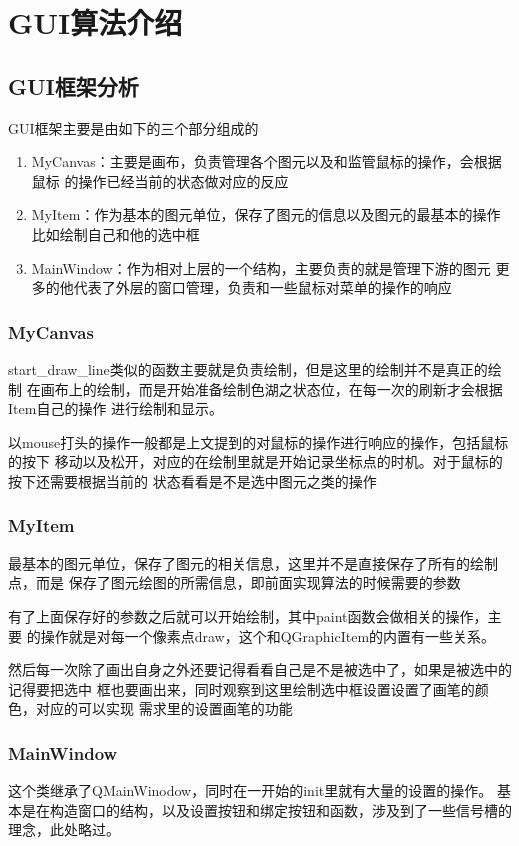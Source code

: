 \documentclass[a4paper,UTF8]{article}
\theoremstyle{definition}
\begin{document}
\section{GUI算法介绍}
\subsection{GUI框架分析}
GUI框架主要是由如下的三个部分组成的

\begin{enumerate}
    \item MyCanvas：主要是画布，负责管理各个图元以及和监管鼠标的操作，会根据鼠标
    的操作已经当前的状态做对应的反应
    
    \item MyItem：作为基本的图元单位，保存了图元的信息以及图元的最基本的操作
    比如绘制自己和他的选中框
    
    \item MainWindow：作为相对上层的一个结构，主要负责的就是管理下游的图元
    更多的他代表了外层的窗口管理，负责和一些鼠标对菜单的操作的响应
\end{enumerate}


\subsubsection{MyCanvas}
start\_draw\_line类似的函数主要就是负责绘制，但是这里的绘制并不是真正的绘制
在画布上的绘制，而是开始准备绘制色湖之状态位，在每一次的刷新才会根据Item自己的操作
进行绘制和显示。

以mouse打头的操作一般都是上文提到的对鼠标的操作进行响应的操作，包括鼠标的按下
移动以及松开，对应的在绘制里就是开始记录坐标点的时机。对于鼠标的按下还需要根据当前的
状态看看是不是选中图元之类的操作

\subsubsection{MyItem}
最基本的图元单位，保存了图元的相关信息，这里并不是直接保存了所有的绘制点，而是
保存了图元绘图的所需信息，即前面实现算法的时候需要的参数

有了上面保存好的参数之后就可以开始绘制，其中paint函数会做相关的操作，主要
的操作就是对每一个像素点draw，这个和QGraphicItem的内置有一些关系。

然后每一次除了画出自身之外还要记得看看自己是不是被选中了，如果是被选中的记得要把选中
框也要画出来，同时观察到这里绘制选中框设置设置了画笔的颜色，对应的可以实现
需求里的设置画笔的功能

\subsubsection{MainWindow}
这个类继承了QMainWinodow，同时在一开始的init里就有大量的设置的操作。
基本是在构造窗口的结构，以及设置按钮和绑定按钮和函数，涉及到了一些信号槽的
理念，此处略过。
\end{document}
